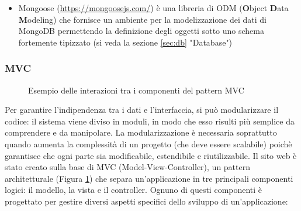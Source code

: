\documentclass[12pt]{report}
\begin{document}
\begin{itemize}
\begin{lstlisting}[language=HTML]
<% for(var i=0; i<tessere.length; i++) { %>
	<tr class="w3-black tessere-table-mobile">
		<td><%= tessere[i].numero_tessera %></td>
		<td><%= tessere[i].seriale %></td>
		<td><%= dateFormat(tessere[i].rilasciato.toLocaleString("it-IT", { "year": "numeric", "month": "2-digit", "day": "2-digit" })) %></td>
		<td><%= dateFormat(tessere[i].ultimo_rinnovo.toLocaleString("it-IT", { "year": "numeric", "month": "2-digit", "day": "2-digit" })) %></td>
		<% if ( tessere[i].stato === "ATTIVATA" ) { %>
			<td>
				<div class="green-circle" style="margin: auto;"></div>
			</td>
		<% } else { %>
			<td>
				<div class="red-circle" style="margin: auto;"></div>
			</td>
		<% } %>
	</tr>
<% } %>
\end{lstlisting}
	\item Mongoose (\url{https://mongoosejs.com/}) è una libreria di ODM (\textbf{O}bject \textbf{D}ata \textbf{M}odeling) che fornisce un ambiente per la modelizzazione dei dati di MongoDB permettendo la definizione degli oggetti sotto uno schema fortemente tipizzato (si veda la sezione \ref{sec:db} "Database")	
\end{itemize}

\subsubsection*{MVC}

\begin{figure}
	\caption{Esempio delle interazioni tra i componenti del pattern MVC}
	\label{fig:mvc}
\end{figure}

Per garantire l'indipendenza tra i dati e l'interfaccia, si può modularizzare il codice: il sistema viene diviso in moduli, in modo che esso risulti più semplice da comprendere e da manipolare. La modularizzazione è necessaria soprattutto quando aumenta la complessità di un progetto (che deve essere scalabile) poichè garantisce che ogni parte sia modificabile, estendibile e riutilizzabile.
Il sito web è stato creato sulla base di MVC (Model-View-Controller), un pattern architetturale (Figura \ref{fig:mvc}) che separa un'applicazione in tre principali componenti logici: il modello, la vista e il controller. Ognuno di questi componenti è progettato per gestire diversi aspetti specifici dello sviluppo di un'applicazione:
\end{document}
